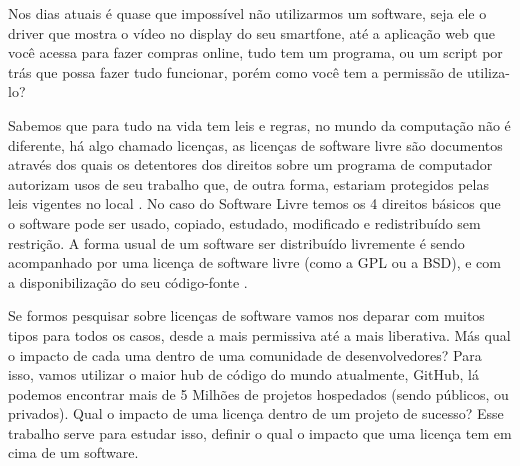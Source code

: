 Nos dias atuais é quase que impossível não utilizarmos um software, seja ele o driver que mostra o vídeo no display do seu smartfone, até a aplicação web que você acessa para fazer compras online, tudo tem um programa, ou um script por trás que possa fazer tudo funcionar, porém como você tem a permissão de utiliza-lo?

Sabemos que para tudo na vida tem leis e regras, no mundo da computação não é diferente, há algo chamado licenças, as licenças de software livre são documentos através dos quais os detentores dos direitos sobre um programa de computador autorizam usos de seu trabalho que, de outra forma, estariam protegidos pelas leis vigentes no local \cite{sabino2009licenccas}. No caso do Software Livre temos os 4 direitos básicos que o software pode ser usado, copiado, estudado, modificado e redistribuído sem restrição. A forma usual de um software ser distribuído livremente é sendo acompanhado por uma licença de software livre (como a GPL ou a BSD), e com a disponibilização do seu código-fonte \cite{campos2006software}.

Se formos pesquisar sobre licenças de software vamos nos deparar com muitos tipos para todos os casos, desde a mais permissiva até a mais liberativa. Más qual o impacto de cada uma dentro de uma comunidade de desenvolvedores? Para isso, vamos utilizar o maior hub de código do mundo atualmente, GitHub, lá podemos encontrar mais de 5 Milhões de projetos hospedados (sendo públicos, ou privados). Qual o impacto de uma licença dentro de um projeto de sucesso? Esse trabalho serve para estudar isso, definir o qual o impacto que uma licença tem em cima de um software.